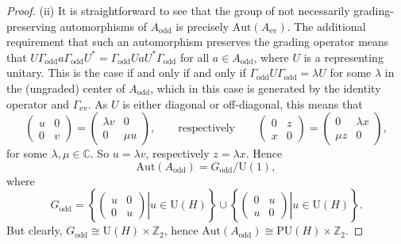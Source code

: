\documentclass[pdftex]{sigma}
\numberwithin{equation}{section}
\newcommand{\Z}{\mathbb{Z}}
\newcommand{\C}{\mathbb{C}}
\newcommand{\Aut}{\mathrm{Aut}}
\newcommand{\U}{\mathrm{U}}
\begin{document}
\begin{proof}
(ii) It is straightforward to see that the group of not necessarily grading-preserving automorphisms of $A_{\mathrm{odd}}$ is precisely $\Aut(A_{\mathrm{ev}})$.
The additional requirement that such an automorphism preserves the grading operator means that $U \Gamma_{\mathrm{odd}} a \Gamma_{\mathrm{odd}} U^* = \Gamma_{\mathrm{odd}} U a U^* \Gamma_{\mathrm{odd}}$ for all $a \in A_{\mathrm{odd}}$, where $U$ is a representing unitary.
This is the case if and only if and only if $\Gamma_{\mathrm{odd}} U \Gamma_{\mathrm{odd}} = \lambda U$ for some $\lambda$ in the (ungraded) center of $A_{\mathrm{odd}}$, which in this case is generated by the identity operator and $\Gamma_{\mathrm{ev}}$.
As $U$ is either diagonal or off-diagonal, this means that
 \begin{equation*}
 	\begin{pmatrix} u & 0 \\ 0 & v \end{pmatrix} = \begin{pmatrix} \lambda v & 0 \\ 0 & \mu u \end{pmatrix}, \qquad \text{respectively} \qquad \begin{pmatrix} 0 & z \\ x & 0 \end{pmatrix} = \begin{pmatrix} 0 & \lambda x \\ \mu z& 0 \end{pmatrix},
 \end{equation*}
 for some $\lambda, \mu \in \C$.
 So $u = \lambda v$, respectively $z = \lambda x$.
 Hence
\begin{equation*} %
 \Aut(A_{\mathrm{odd}}) = G_{\mathrm{odd}} / \U(1),
\end{equation*}
where
\begin{equation} \label{DefGodd}
 G_{\mathrm{odd}} = \left\{ \left.\begin{pmatrix} u & 0 \\ 0 & u \end{pmatrix} \right| u \in \U(H)\right\} \cup \left\{ \left.\begin{pmatrix} 0 & u \\ u & 0 \end{pmatrix} \right| u \in \U(H)\right\}.
\end{equation}
But clearly, $G_{\mathrm{odd}} \cong \U(H) \times \Z_2$, hence $\Aut(A_{\mathrm{odd}}) \cong \mathrm{PU}(H) \times \Z_2$.
\end{proof}
\end{document}

